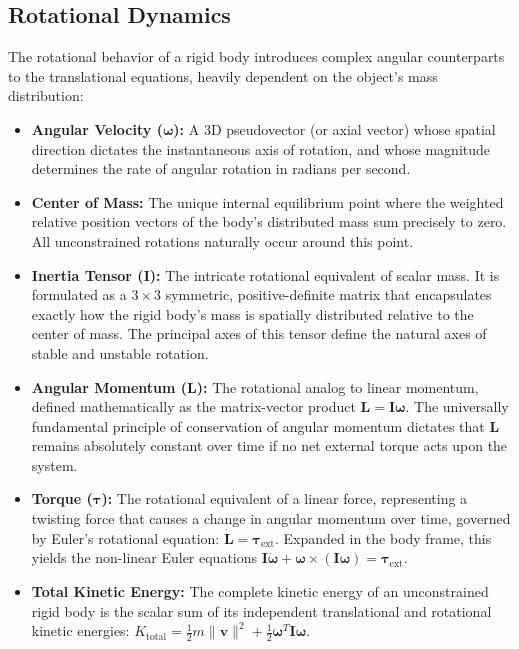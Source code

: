 \subsection{Rotational Dynamics}
The rotational behavior of a rigid body introduces complex angular counterparts to the translational equations, heavily dependent on the object's mass distribution:
\begin{itemize}
    \item \textbf{Angular Velocity ($\bm{\omega}$):} A 3D pseudovector (or axial vector) whose spatial direction dictates the instantaneous axis of rotation, and whose magnitude determines the rate of angular rotation in radians per second.
    \item \textbf{Center of Mass:} The unique internal equilibrium point where the weighted relative position vectors of the body's distributed mass sum precisely to zero. All unconstrained rotations naturally occur around this point.
    \item \textbf{Inertia Tensor ($\bm{I}$):} The intricate rotational equivalent of scalar mass. It is formulated as a $3 \times 3$ symmetric, positive-definite matrix that encapsulates exactly how the rigid body's mass is spatially distributed relative to the center of mass. The principal axes of this tensor define the natural axes of stable and unstable rotation.
    \item \textbf{Angular Momentum ($\bm{L}$):} The rotational analog to linear momentum, defined mathematically as the matrix-vector product $\bm{L} = \bm{I} \bm{\omega}$. The universally fundamental principle of conservation of angular momentum dictates that $\bm{L}$ remains absolutely constant over time if no net external torque acts upon the system.
    \item \textbf{Torque ($\bm{\tau}$):} The rotational equivalent of a linear force, representing a twisting force that causes a change in angular momentum over time, governed by Euler's rotational equation: $\dot{\bm{L}} = \bm{\tau}_{\text{ext}}$. Expanded in the body frame, this yields the non-linear Euler equations $\bm{I}\dot{\bm{\omega}} + \bm{\omega} \times (\bm{I}\bm{\omega}) = \bm{\tau}_{\text{ext}}$.
    \item \textbf{Total Kinetic Energy:} The complete kinetic energy of an unconstrained rigid body is the scalar sum of its independent translational and rotational kinetic energies: $K_{\text{total}} = \frac{1}{2} m \|\bm{v}\|^2 + \frac{1}{2} \bm{\omega}^T \bm{I} \bm{\omega}$.
\end{itemize}

